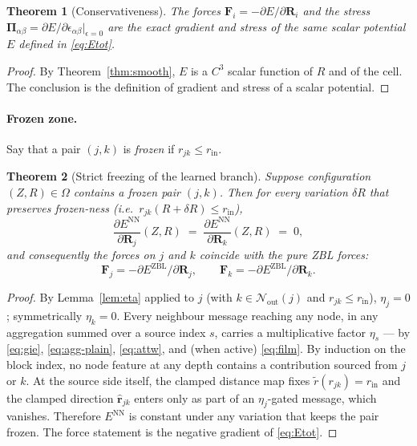 \documentclass[11pt,a4paper]{article}
\newcommand{\bR}{\bm{R}}
\newcommand{\brh}{\hat{\bm{r}}}
\newcommand{\bmF}{\bm{F}}
\newcommand{\rin}{r_{\mathrm{in}}}
\newcommand{\rtilde}{\widetilde{r}}
\newcommand{\Nb}{\mathcal{N}}
\theoremstyle{plain}
\newtheorem{theorem}{Theorem}
\theoremstyle{definition}
\theoremstyle{remark}
\begin{document}
\begin{theorem}[Conservativeness]\label{thm:cons}
    The forces $\bmF_i=-\partial E/\partial\bR_i$ and the stress $\bm{\Pi}_{\alpha\beta}=\partial E/\partial\epsilon_{\alpha\beta}\big|_{\epsilon=0}$ are the exact gradient and stress of the same scalar potential $E$ defined in \eqref{eq:Etot}.
\end{theorem}
\begin{proof}
    By Theorem~\ref{thm:smooth}, $E$ is a $C^3$ scalar function of $R$ and of the cell.
    The conclusion is the definition of gradient and stress of a scalar potential.
\end{proof}

\paragraph{Frozen zone.}
Say that a pair $(j,k)$ is \emph{frozen} if $r_{jk}\leq\rin$.

\begin{theorem}[Strict freezing of the learned branch]\label{thm:freeze}
    Suppose configuration $(Z,R)\in\Omega$ contains a frozen pair $(j,k)$.
    Then for every variation $\delta R$ that preserves frozen-ness (i.e.\ $r_{jk}(R+\delta R)\leq\rin$),
    \begin{equation}
        \frac{\partial E^{\mathrm{NN}}}{\partial\bR_j}(Z,R)\;=\;\frac{\partial E^{\mathrm{NN}}}{\partial\bR_k}(Z,R)\;=\;0,
    \end{equation}
    and consequently the forces on $j$ and $k$ coincide with the pure ZBL forces:
    \begin{equation}
        \bmF_j=-\partial E^{\mathrm{ZBL}}/\partial\bR_j,\qquad
        \bmF_k=-\partial E^{\mathrm{ZBL}}/\partial\bR_k.
    \end{equation}
\end{theorem}
\begin{proof}
    By Lemma~\ref{lem:eta} applied to $j$ (with $k\in\Nb_{\mathrm{out}}(j)$ and $r_{jk}\leq\rin$), $\eta_j=0$; symmetrically $\eta_k=0$.
    Every neighbour message reaching any node, in any aggregation summed over a source index $s$, carries a multiplicative factor $\eta_s$ — by \eqref{eq:gie}, \eqref{eq:agg-plain}, \eqref{eq:attw}, and (when active) \eqref{eq:film}.
    By induction on the block index, no node feature at any depth contains a contribution sourced from $j$ or $k$.
    At the source side itself, the clamped distance map fixes $\rtilde(r_{jk})=\rin$ and the clamped direction $\brh_{jk}$ enters only as part of an $\eta_j$-gated message, which vanishes.
    Therefore $E^{\mathrm{NN}}$ is constant under any variation that keeps the pair frozen.
    The force statement is the negative gradient of \eqref{eq:Etot}.
\end{proof}
\end{document}
